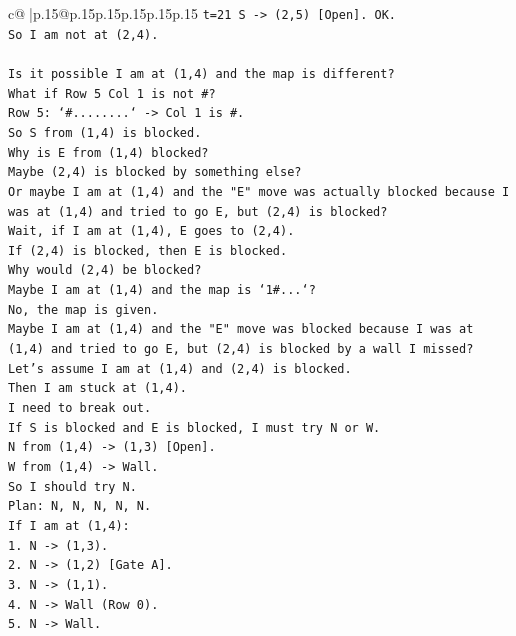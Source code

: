 \documentclass{article}
\begin{document}
{\begin{supertabular}{c@{$\;$}|p{.15\linewidth}@{}p{.15\linewidth}p{.15\linewidth}p{.15\linewidth}p{.15\linewidth}p{.15\linewidth}}
{{{\texttt{t=21 S {-}> (2,5) {[}Open{]}. OK.} \\
\texttt{So I am not at (2,4).} \\
\\ 
\texttt{Is it possible I am at (1,4) and the map is different?} \\
\texttt{What if Row 5 Col 1 is not \#?} \\
\texttt{Row 5: `\#........` {-}> Col 1 is \#.} \\
\texttt{So S from (1,4) is blocked.} \\
\texttt{Why is E from (1,4) blocked?} \\
\texttt{Maybe (2,4) is blocked by something else?} \\
\texttt{Or maybe I am at (1,4) and the "E" move was actually blocked because I was at (1,4) and tried to go E, but (2,4) is blocked?} \\
\texttt{Wait, if I am at (1,4), E goes to (2,4).} \\
\texttt{If (2,4) is blocked, then E is blocked.} \\
\texttt{Why would (2,4) be blocked?} \\
\texttt{Maybe I am at (1,4) and the map is `1\#...`?} \\
\texttt{No, the map is given.} \\
\texttt{Maybe I am at (1,4) and the "E" move was blocked because I was at (1,4) and tried to go E, but (2,4) is blocked by a wall I missed?} \\
\texttt{Let's assume I am at (1,4) and (2,4) is blocked.} \\
\texttt{Then I am stuck at (1,4).} \\
\texttt{I need to break out.} \\
\texttt{If S is blocked and E is blocked, I must try N or W.} \\
\texttt{N from (1,4) {-}> (1,3) {[}Open{]}.} \\
\texttt{W from (1,4) {-}> Wall.} \\
\texttt{So I should try N.} \\
\texttt{Plan: N, N, N, N, N.} \\
\texttt{If I am at (1,4):} \\
\texttt{1. N {-}> (1,3).} \\
\texttt{2. N {-}> (1,2) {[}Gate A{]}.} \\
\texttt{3. N {-}> (1,1).} \\
\texttt{4. N {-}> Wall (Row 0).} \\
\texttt{5. N {-}> Wall.} \\
}}}
\end{supertabular}}
\end{document}
